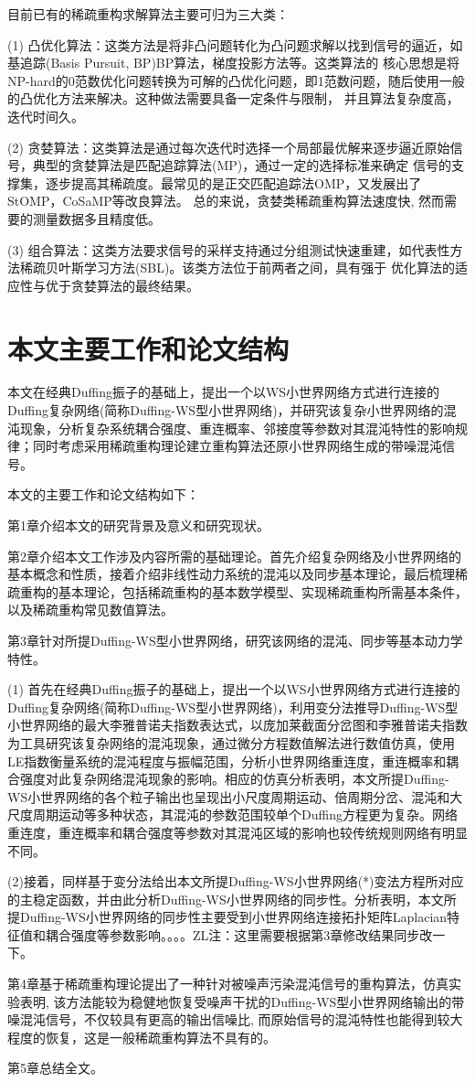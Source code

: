 目前已有的稀疏重构求解算法主要可归为三大类： 

(1)	凸优化算法：这类方法是将非凸问题转化为凸问题求解以找到信号的逼近，如基追踪(Basis Pursuit, BP)BP算法，梯度投影方法等。这类算法的
核心思想是将NP-hard的0范数优化问题转换为可解的凸优化问题，即1范数问题，随后使用一般的凸优化方法来解决。这种做法需要具备一定条件与限制，
并且算法复杂度高，迭代时间久。

(2)	贪婪算法：这类算法是通过每次迭代时选择一个局部最优解来逐步逼近原始信号，典型的贪婪算法是匹配追踪算法(MP)，通过一定的选择标准来确定
信号的支撑集，逐步提高其稀疏度。最常见的是正交匹配追踪法OMP，又发展出了StOMP，CoSaMP等改良算法。
总的来说，贪婪类稀疏重构算法速度快, 然而需要的测量数据多且精度低。

(3)	组合算法：这类方法要求信号的采样支持通过分组测试快速重建，如代表性方法稀疏贝叶斯学习方法(SBL)。该类方法位于前两者之间，具有强于
优化算法的适应性与优于贪婪算法的最终结果。
\section{本文主要工作和论文结构}
本文在经典Duffing振子的基础上，提出一个以WS小世界网络方式进行连接的Duffing复杂网络(简称Duffing-WS型小世界网络)，并研究该复杂小世界网络的混沌现象，分析复杂系统耦合强度、重连概率、邻接度等参数对其混沌特性的影响规律；同时考虑采用稀疏重构理论建立重构算法还原小世界网络生成的带噪混沌信号。

本文的主要工作和论文结构如下：

第1章介绍本文的研究背景及意义和研究现状。

第2章介绍本文工作涉及内容所需的基础理论。首先介绍复杂网络及小世界网络的基本概念和性质，接着介绍非线性动力系统的混沌以及同步基本理论，最后梳理稀疏重构的基本理论，包括稀疏重构的基本数学模型、实现稀疏重构所需基本条件，以及稀疏重构常见数值算法。

第3章针对所提Duffing-WS型小世界网络，研究该网络的混沌、同步等基本动力学特性。

(1) 首先在经典Duffing振子的基础上，提出一个以WS小世界网络方式进行连接的Duffing复杂网络(简称Duffing-WS型小世界网络)，利用变分法推导Duffing-WS型小世界网络的最大李雅普诺夫指数表达式，以庞加莱截面分岔图和李雅普诺夫指数为工具研究该复杂网络的混沌现象，通过微分方程数值解法进行数值仿真，使用LE指数衡量系统的混沌程度与振幅范围，分析小世界网络重连度，重连概率和耦合强度对此复杂网络混沌现象的影响。相应的仿真分析表明，本文所提Duffing-WS小世界网络的各个粒子输出也呈现出小尺度周期运动、倍周期分岔、混沌和大尺度周期运动等多种状态，其混沌的参数范围较单个Duffing方程更为复杂。网络重连度，重连概率和耦合强度等参数对其混沌区域的影响也较传统规则网络有明显不同。

(2)接着，同样基于变分法给出本文所提Duffing-WS小世界网络(*)变法方程所对应的主稳定函数，并由此分析Duffing-WS小世界网络的同步性。分析表明，本文所提Duffing-WS小世界网络的同步性主要受到小世界网络连接拓扑矩阵Laplacian特征值和耦合强度等参数影响\textcolor[rgb]{0.00,0.00,1.00}{。。。。ZL注：这里需要根据第3章修改结果同步改一下。}

第4章基于稀疏重构理论提出了一种针对被噪声污染混沌信号的重构算法，仿真实验表明, 该方法能较为稳健地恢复受噪声干扰的Duffing-WS型小世界网络输出的带噪混沌信号，不仅较具有更高的输出信噪比, 而原始信号的混沌特性也能得到较大程度的恢复，这是一般稀疏重构算法不具有的。

第5章总结全文。